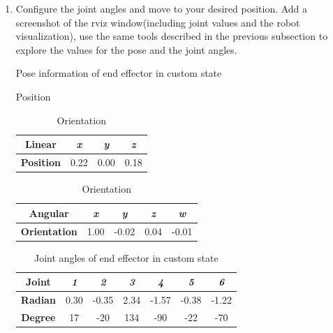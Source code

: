 \documentclass[12pt]{article}
\begin{document}
\begin{enumerate}

    \item Configure the joint angles and move to your desired position. Add a screenshot of the rviz window(including joint values and the robot visualization), use the same tools described in the previous subsection to explore the values for the pose and the joint angles.
    
    \begin{table}[H]
        \caption{Pose information of end effector in custom state}
        \begin{subtable}{.4\linewidth}
            \centering
            \caption{Position}
            \begin{tabular}{cccc}
                \toprule
                \textbf{Linear} & \textit{x} & \textit{y} & \textit{z} \\\midrule
                \textbf{Position} & 0.22 & 0.00 & 0.18 \\\bottomrule
            \end{tabular}
        \end{subtable}
        \hfill
        \begin{subtable}{.52\linewidth}
            \centering
            \caption{Orientation}
            \begin{tabular}{ccccc}
                \toprule
                \textbf{Angular} & \textit{x} & \textit{y} & \textit{z} & \textit{w} \\\midrule
                \textbf{Orientation} & 1.00 & -0.02 & 0.04 & -0.01 \\\bottomrule
            \end{tabular}
        \end{subtable}
    \end{table}
    \vspace{-10pt}
    \begin{table}[H]
        \centering
        \caption{Joint angles of end effector in custom state}
        \begin{tabular}{ccccccc}
        \toprule
        \textbf{Joint} & \textit{1} & \textit{2} & \textit{3} & \textit{4} & \textit{5} & \textit{6} \\\midrule
        \textbf{Radian} & 0.30 & -0.35 & 2.34 & -1.57 & -0.38 & -1.22 \\
        \textbf{Degree} & 17 & -20 & 134 & -90 & -22 & -70 \\\bottomrule
        \end{tabular}
    \end{table}


\end{enumerate}
\end{document}
